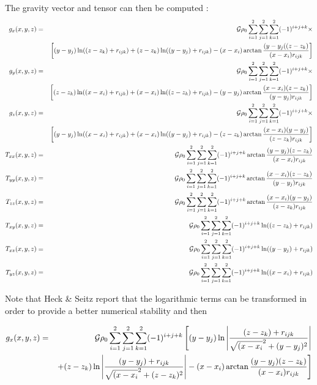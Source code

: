 The gravity vector and tensor can then be computed \cite{plou76,arct15,cooo15}:
\begin{eqnarray}
g_x(x,y,z) &=&{\cal G} \rho_0 \sum_{i=1}^2\sum_{j=1}^2\sum_{k=1}^2 (-1)^{i+j+k} \times \nonumber\\
&&\left[(y-y_j) \ln((z-z_k)+r_{ijk}) + (z-z_k)\ln((y-y_j)+r_{ijk}) - (x-x_i) \arctan  \frac{(y-y_j( (z-z_k)}{(x-x_i) r_{ijk}} \right] \nonumber\\ 
g_y(x,y,z) &=&{\cal G} \rho_0 \sum_{i=1}^2\sum_{j=1}^2\sum_{k=1}^2 (-1)^{i+j+k} \times \nonumber\\
&&\left[(z-z_k) \ln((x-x_i)+r_{ijk}) + (x-x_i)\ln((z-z_k)+r_{ijk}) - (y-y_j) \arctan  \frac{(x-x_i) (z-z_k)}{(y-y_j) r_{ijk}} \right] \nonumber\\ 
g_z(x,y,z) &=&{\cal G} \rho_0 \sum_{i=1}^2\sum_{j=1}^2\sum_{k=1}^2 (-1)^{i+j+k} \times \nonumber\\
&&\left[(y-y_j) \ln((x-x_i)+r_{ijk}) + (x-x_i)\ln((y-y_j)+r_{ijk}) - (z-z_k) \arctan  \frac{(x-x_i) (y-y_j)}{(z-z_k) r_{ijk}} \right] \nonumber\\ 
T_{xx}(x,y,z) &=& {\cal G} \rho_0 \sum_{i=1}^2\sum_{j=1}^2\sum_{k=1}^2 (-1)^{i+j+k} \arctan \frac{(y-y_j) (z-z_k)}{(x-x_i) r_{ijk}}\nonumber\\
T_{yy}(x,y,z) &=& {\cal G} \rho_0 \sum_{i=1}^2\sum_{j=1}^2\sum_{k=1}^2 (-1)^{i+j+k} \arctan \frac{(x-x_i) (z-z_k)}{(y-y_j) r_{ijk}}\nonumber\\
T_{zz}(x,y,z) &=& {\cal G} \rho_0 \sum_{i=1}^2\sum_{j=1}^2\sum_{k=1}^2 (-1)^{i+j+k} \arctan \frac{(x-x_i) (y-y_j)}{(z-z_k) r_{ijk}}\nonumber\\
T_{xy}(x,y,z) &=& {\cal G} \rho_0 \sum_{i=1}^2\sum_{j=1}^2\sum_{k=1}^2 (-1)^{i+j+k} \ln ((z-z_k) + r_{ijk})\nonumber\\
T_{xz}(x,y,z) &=& {\cal G} \rho_0 \sum_{i=1}^2\sum_{j=1}^2\sum_{k=1}^2 (-1)^{i+j+k} \ln ((y-y_j) + r_{ijk})\nonumber\\
T_{yz}(x,y,z) &=& {\cal G} \rho_0 \sum_{i=1}^2\sum_{j=1}^2\sum_{k=1}^2 (-1)^{i+j+k} \ln ((x-x_i) + r_{ijk})\nonumber
\end{eqnarray}

Note that Heck \& Seitz \cite{hese07} report that the logarithmic terms can be transformed in order to provide a better numerical stability and then

\begin{eqnarray}
g_x(x,y,z) 
&=&{\cal G} \rho_0 \sum_{i=1}^2\sum_{j=1}^2\sum_{k=1}^2 (-1)^{i+j+k}  
\left[(y-y_j) \ln \left|\frac{(z-z_k)+r_{ijk}}{\sqrt{(x-x_i}^2+(y-y_j)^2}\right|   \right. \nonumber\\
&& \left.  + (z-z_k) \ln \left| \frac{ (y-y_j)+r_{ijk}}{ \sqrt{(x-x_i}^2+(z-z_k)^2 } \right|
  - (x-x_i) \arctan  \frac{(y-y_j) (z-z_k)}{(x-x_i) r_{ijk}} \right] 
\end{eqnarray}

